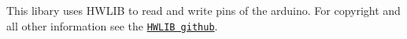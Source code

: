 This libary uses H\+W\+L\+IB to read and write pins of the arduino. For copyright and all other information see the \href{https://github.com/wovo/hwlib}{\tt H\+W\+L\+IB github}. 